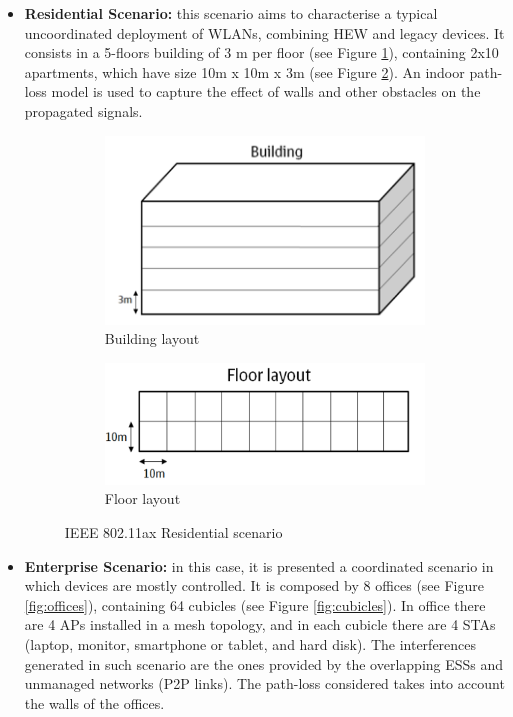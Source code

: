 \documentclass[12pt, a4paper,twoside]{tesi_upf}
\begin{document}
		\begin{itemize}			
			\item \textbf{Residential Scenario:} this scenario aims to characterise a typical uncoordinated deployment of WLANs, combining HEW and legacy devices. It consists in a 5-floors building of 3 m per floor (see Figure \ref{fig:building}), containing 2x10 apartments, which have size 10m x 10m x 3m (see Figure \ref{fig:floor}). An indoor path-loss model is used to capture the effect of walls and other obstacles on the propagated signals. 
			\begin{figure}[h!]
				\centering
				\begin{subfigure}[b]{0.4\textwidth}
					\includegraphics[width=\textwidth]{images/residential_ax_1}
					\caption{Building layout}
					\label{fig:building}
				\end{subfigure}
				\begin{subfigure}[b]{0.4\textwidth}
					\includegraphics[width=\textwidth]{images/residential_ax_2}
					\caption{Floor layout}
					\label{fig:floor}
				\end{subfigure}		
				\caption{IEEE 802.11ax Residential scenario}
				\label{fig:ax_residential_scenario}
			\end{figure}			
			\item \textbf{Enterprise Scenario:} in this case, it is presented a coordinated scenario in which devices are mostly controlled. It is composed by 8 offices (see Figure \ref{fig:offices}), containing 64 cubicles (see Figure \ref{fig:cubicles}). In office there are 4 APs installed in a mesh topology, and in each cubicle there are 4 STAs (laptop, monitor, smartphone or tablet, and hard disk). The interferences generated in such scenario are the ones provided by the overlapping ESSs and unmanaged networks (P2P links). The path-loss considered takes into account the walls of the offices.

\end{itemize}
\end{document}
